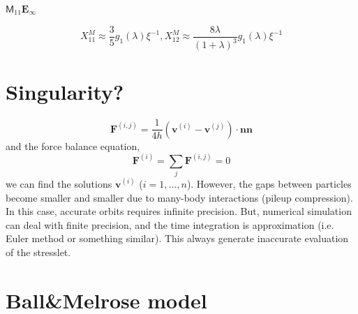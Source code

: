\documentclass[11pt]{scrartcl}
\newcommand{\tens}[1]{\bm{\mathsf{#1}}}
\begin{document}
$\tens{M}_{11} \bm{E}_{\infty}$

\begin{equation}
  X_{11}^{M}
\approx
\frac{3}{5} g_1(\lambda) \xi^{-1},
 X_{12}^{M}
\approx
\frac{8\lambda}{(1+\lambda)^3} g_1(\lambda) \xi^{-1}
\end{equation}




\newpage

\section{Singularity?}

\begin{equation}
 \bm{F}^{(i,j)} = \frac{1}{4h}(\bm{v}^{(i)} - \bm{v}^{(j)})\cdot \bm{n} \bm{n}
\end{equation}
and the force balance equation,
\begin{equation}
 \bm{F}^{(i)} = 
\sum_j
 \bm{F}^{(i,j)} = 0
\end{equation}
we can find the solutions $\bm{v}^{(i)}$ ($i=1,\dotsc,n$).
%
However,
the gaps between particles 
become smaller and smaller 
due to many-body interactions (pileup compression).
%
In this case,
accurate orbits requires infinite precision.
%
But, numerical simulation can deal with finite precision,
and the time integration is approximation (i.e. Euler method or something similar).
%
This always generate inaccurate evaluation of the stresslet.







\section{Ball\&Melrose model}
\end{document}
